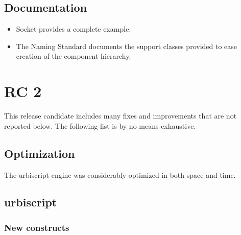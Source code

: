\subsection{Documentation}

\begin{itemize}
\item Socket provides a complete example.
\item The Naming Standard documents the support classes provided to ease
  creation of the component hierarchy.
\end{itemize}

\section{ RC 2}

This release candidate includes many fixes and improvements that are
not reported below. The following list is by no means exhaustive.

\subsection{Optimization}

The urbiscript engine was considerably optimized in both space and
time.

\subsection{urbiscript}

\subsubsection{New constructs}

